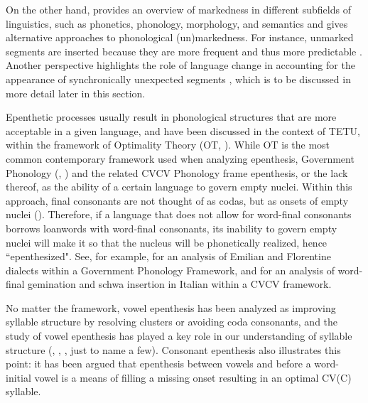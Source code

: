 \documentclass[output=paper,colorlinks,citecolor=brown]{langscibook}
\begin{document}
On the other hand, \citet{Haspelmath2006} provides an overview of markedness in different subfields of linguistics, such as phonetics, phonology, morphology, and semantics and gives alternative approaches to phonological (un)markedness. For instance, unmarked segments are inserted because they are more frequent and thus more predictable \citep{Hume2004}. Another perspective highlights the role of language change in accounting for the appearance of synchronically unexpected segments \citep{Blevins2004}, which is to be discussed in more detail later in this section.

Epenthetic processes usually result in phonological structures that are more acceptable in a given language, and have been discussed in the context of TETU, within the framework of Optimality Theory (OT, \citealt{PrinceSmolensky1993}). While OT is the most common contemporary framework used when analyzing epenthesis, Government Phonology (\citealt{Kaye1990}, \citealt{Kayeetal1990}) and the related CVCV Phonology \citep{Scheer2004} frame epenthesis, or the lack thereof, as the ability of a certain language to govern empty nuclei. Within this approach, final consonants are not thought of as codas, but as onsets of empty nuclei (\citealt{HarrisGussmann1998}). Therefore, if a language that does not allow for word-final consonants borrows loanwords with word-final consonants, its inability to govern empty nuclei will make it so that the nucleus will be phonetically realized, hence ``epenthesized". See, for example, \citet{Bafile2001, Bafile2002} for an analysis of Emilian and Florentine dialects within a Government Phonology Framework, and \citet{Passino2008} for an analysis of word-final gemination and schwa insertion in Italian within a CVCV framework.

No matter the framework, vowel epenthesis has been analyzed as improving syllable structure by resolving clusters or avoiding coda consonants, and the study of vowel epenthesis has played a key role in our understanding of syllable structure (\citealt{Broselow1982}, \citealt{Ito1989}, \citealt{Piggott1995}, just to name a few). Consonant epenthesis also illustrates this point: it has been argued that epenthesis between vowels  and before a word-initial vowel  is a means of filling a missing onset resulting in an optimal CV(C) syllable.
\end{document}
